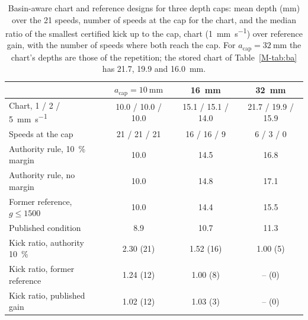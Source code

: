 \begin{table}[!htbp]
  \centering
  \caption{Basin-aware chart and reference designs for three depth caps: mean depth (\si{\milli\metre}) over the 21 speeds, number of speeds at the cap for the chart, and the median ratio of the smallest certified kick up to the cap, chart (\SI{1}{\milli\metre\per\second}) over reference gain, with the number of speeds where both reach the cap. For $a_{\mathrm{cap}}=\SI{32}{\milli\metre}$ the chart's depths are those of the repetition; the stored chart of Table~\ref{M-tab:ba} has 21.7, 19.9 and \SI{16.0}{\milli\metre}.}
  \label{tab:ba-cap}
  \footnotesize
  \setlength{\tabcolsep}{4pt}
  \begin{tabular}{@{}lccc@{}}
    \toprule
    & $a_{\mathrm{cap}}=\SI{10}{\milli\metre}$ & \SI{16}{\milli\metre} & \SI{32}{\milli\metre}\\
    \midrule
    Chart, 1 / 2 / \SI{5}{\milli\metre\per\second} & 10.0 / 10.0 / 10.0 & 15.1 / 15.1 / 14.0 & 21.7 / 19.9 / 15.9\\
    Speeds at the cap & 21 / 21 / 21 & 16 / 16 / 9 & 6 / 3 / 0\\
    Authority rule, \SI{10}{\percent} margin & 10.0 & 14.5 & 16.8\\
    Authority rule, no margin & 10.0 & 14.8 & 17.1\\
    Former reference, $g\le1500$ & 10.0 & 14.4 & 15.5\\
    Published condition & 8.9 & 10.7 & 11.3\\
    \addlinespace
    Kick ratio, authority \SI{10}{\percent} & 2.30 (21) & 1.52 (16) & 1.00 (5)\\
    Kick ratio, former reference & 1.24 (12) & 1.00 (8) & -- (0)\\
    Kick ratio, published gain & 1.02 (12) & 1.03 (3) & -- (0)\\
    \bottomrule
  \end{tabular}
\end{table}

